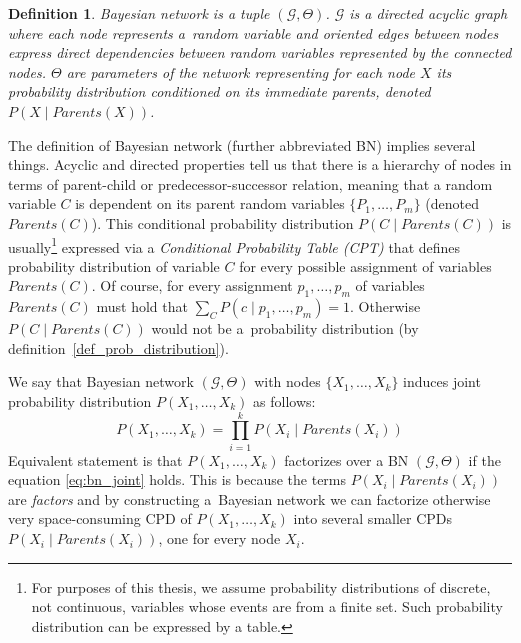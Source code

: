 \documentclass[english,cover]{fitthesis} %
\newtheorem{math_def}{Definition}[chapter] %
\newcommand{\term}[1]{\emph{#1}}           %
\begin{document}
\begin{math_def}\label{def_bayesian_network}
    Bayesian network is a tuple $(\mathcal{G}, \Theta)$. $\mathcal{G}$ is a directed acyclic graph where each node represents a~random variable and oriented edges between nodes express direct dependencies between random variables represented by the connected nodes. $\Theta$ are parameters of the network representing for each node $X$ its probability distribution conditioned on its immediate parents, denoted $P(X \mid Parents(X))$.
\end{math_def}

The definition of Bayesian network (further abbreviated BN) implies several things. Acyclic and directed properties tell us that there is a hierarchy of nodes in terms of parent-child or predecessor-successor relation, meaning that a random variable $C$ is dependent on its parent random variables $\lbrace P_1, \dots, P_m \rbrace$ (denoted $Parents(C)$). This conditional probability distribution $P(C \mid Parents(C))$ is usually\footnote{For purposes of this thesis, we assume probability distributions of discrete, not continuous, variables whose events are from a finite set. Such probability distribution can be expressed by a table.} expressed via a \term{Conditional Probability Table (CPT)} that defines probability distribution of variable $C$ for every possible assignment of variables $Parents(C)$. Of course, for every assignment $p_1,\dots,p_m$ of variables $Parents(C)$ must hold that $\sum_C P(c \mid p_1, \dots, p_m) = 1$. Otherwise $P(C \mid Parents(C))$ would not be a~probability distribution (by definition~\ref{def_prob_distribution}).

We say that Bayesian network $(\mathcal{G}, \Theta)$ with nodes $\lbrace X_1, \dots, X_k\rbrace$ induces joint probability distribution $P(X_1, \dots, X_k)$ as follows:
\begin{equation}\label{eq:bn_joint}
    P(X_1, \dots, X_k) = \prod_{i=1}^k P(X_i \mid Parents(X_i))
\end{equation}
Equivalent statement is that $P(X_1, \dots, X_k)$ factorizes over a BN $(\mathcal{G}, \Theta)$ if the equation \eqref{eq:bn_joint} holds. This is because the terms $P(X_i \mid Parents(X_i))$ are \term{factors} and by constructing a~Bayesian network we can factorize otherwise very space-consuming CPD of $P(X_1, \dots, X_k)$ into several smaller CPDs $P(X_i \mid Parents(X_i))$, one for every node $X_i$.
\end{document}
